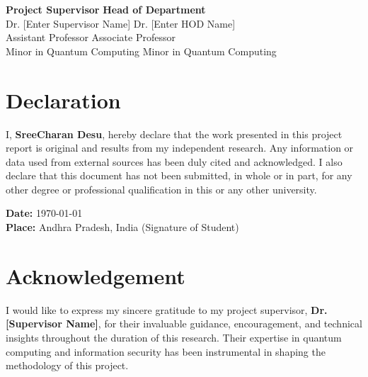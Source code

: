 \documentclass[journal,onecolumn,12pt,draftclsnofoot]{IEEEtran}
\begin{document}
\vspace{1in}

\noindent \textbf{Project Supervisor} \hfill \textbf{Head of Department} \\
Dr. [Enter Supervisor Name] \hfill Dr. [Enter HOD Name] \\
Assistant Professor \hfill Associate Professor \\
Minor in Quantum Computing \hfill Minor in Quantum Computing

\newpage

\section*{Declaration}
\vspace{0.5in}

I, \textbf{SreeCharan Desu}, hereby declare that the work presented in this project report is original and results from my independent research. Any information or data used from external sources has been duly cited and acknowledged. I also declare that this document has not been submitted, in whole or in part, for any other degree or professional qualification in this or any other university.

\vspace{1in}

\noindent \textbf{Date:} \today \\
\noindent \textbf{Place:} Andhra Pradesh, India \hfill (Signature of Student)

\newpage

\section*{Acknowledgement}
\vspace{0.5in}

I would like to express my sincere gratitude to my project supervisor, \textbf{Dr. [Supervisor Name]}, for their invaluable guidance, encouragement, and technical insights throughout the duration of this research. Their expertise in quantum computing and information security has been instrumental in shaping the methodology of this project.
\end{document}
